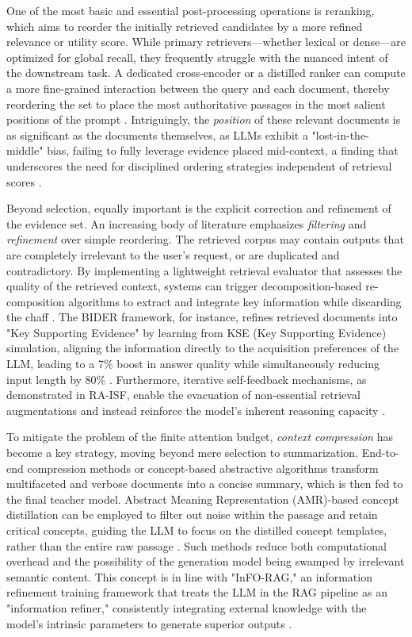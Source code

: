 \documentclass[11pt,a4paper]{article}
\begin{document}
One of the most basic and essential post-processing operations is reranking, which aims to reorder the initially retrieved candidates by a more refined relevance or utility score. While primary retrievers---whether lexical or dense---are optimized for global recall, they frequently struggle with the nuanced intent of the downstream task. A dedicated cross-encoder or a distilled ranker can compute a more fine-grained interaction between the query and each document, thereby reordering the set to place the most authoritative passages in the most salient positions of the prompt \cite{arxiv:2407.02485v1}. Intriguingly, the \emph{position} of these relevant documents is as significant as the documents themselves, as LLMs exhibit a "lost-in-the-middle" bias, failing to fully leverage evidence placed mid-context, a finding that underscores the need for disciplined ordering strategies independent of retrieval scores \cite{arxiv:2402.13178v2,arxiv:2409.01666v1}.

Beyond selection, equally important is the explicit correction and refinement of the evidence set. An increasing body of literature emphasizes \emph{filtering} and \emph{refinement} over simple reordering. The retrieved corpus may contain outputs that are completely irrelevant to the user's request, or are duplicated and contradictory. By implementing a lightweight retrieval evaluator that assesses the quality of the retrieved context, systems can trigger decomposition-based re-composition algorithms to extract and integrate key information while discarding the chaff \cite{arxiv:2404.10981v1}. The BIDER framework, for instance, refines retrieved documents into "Key Supporting Evidence" by learning from KSE (Key Supporting Evidence) simulation, aligning the information directly to the acquisition preferences of the LLM, leading to a 7\% boost in answer quality while simultaneously reducing input length by 80\% \cite{arxiv:2402.12174v1}. Furthermore, iterative self-feedback mechanisms, as demonstrated in RA-ISF, enable the evacuation of non-essential retrieval augmentations and instead reinforce the model's inherent reasoning capacity \cite{arxiv:2403.06840v1}.

To mitigate the problem of the finite attention budget, \emph{context compression} has become a key strategy, moving beyond mere selection to summarization. End-to-end compression methods or concept-based abstractive algorithms transform multifaceted and verbose documents into a concise summary, which is then fed to the final teacher model. Abstract Meaning Representation (AMR)-based concept distillation can be employed to filter out noise within the passage and retain critical concepts, guiding the LLM to focus on the distilled concept templates, rather than the entire raw passage \cite{arxiv:2405.03085v1}. Such methods reduce both computational overhead and the possibility of the generation model being swamped by irrelevant semantic content. This concept is in line with "InFO-RAG," an information refinement training framework that treats the LLM in the RAG pipeline as an "information refiner," consistently integrating external knowledge with the model's intrinsic parameters to generate superior outputs \cite{arxiv:2402.18150v1}.
\end{document}
